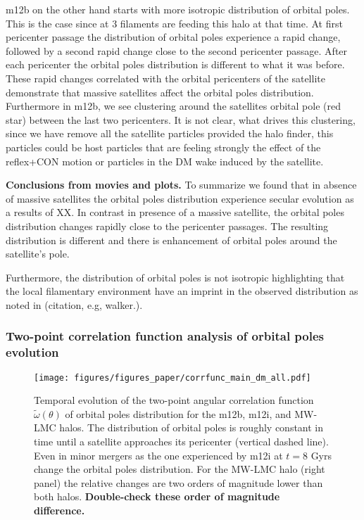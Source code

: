 \documentclass{aastex63}
\begin{document}
m12b on the other hand starts with more isotropic distribution of orbital poles. This is the case since at 3 filaments are feeding this halo at that time. At first pericenter passage the distribution of orbital poles experience a rapid change, followed by a second rapid change close to the second pericenter passage. After each pericenter the orbital poles distribution is  different to what it was before. These rapid changes correlated with the orbital pericenters of the satellite demonstrate that massive satellites affect the orbital poles distribution. Furthermore in m12b, we see clustering around the satellites orbital pole (red star) between the last two pericenters. It is not clear, what drives this clustering, since we have remove all the satellite particles provided the halo finder, this particles could be host particles that are feeling strongly the effect of the reflex+CON motion or particles in the DM wake induced by the satellite. 



\textbf{Conclusions from movies and plots.}
To summarize we found that in absence of massive satellites the orbital poles distribution experience secular evolution as a results of XX. In contrast in presence of a massive satellite, 
the orbital poles distribution changes rapidly close to the pericenter passages. The resulting distribution is different and there is enhancement of orbital poles around the satellite's pole. 

Furthermore, the distribution of orbital poles is not isotropic highlighting that the local filamentary environment have an imprint in the observed distribution as noted in (citation, e.g, walker.).  


\subsubsection{Two-point correlation function analysis of orbital poles evolution}\label{sec:corrfunc}


\begin{figure*}[h]
    \centering
    \texttt{[image: figures/figures\_paper/corrfunc\_main\_dm\_all.pdf]}
    \caption{Temporal evolution of the two-point angular correlation function
      $\tilde{\omega}(\theta)$ of orbital poles distribution for the m12b, m12i, and MW-LMC halos. The
    distribution of orbital poles is roughly constant in time until a satellite
  approaches its pericenter (vertical dashed line). Even in minor mergers as the
one experienced by m12i at $t=8$ Gyrs change the orbital poles
distribution. For the MW-LMC halo (right panel) the relative changes are two
orders of magnitude lower than both \Latte halos. {\textbf{Double-check these
order of magnitude difference.}}}
    \label{fig:2d_corrfunc_alldm}
\end{figure*}
\end{document}
